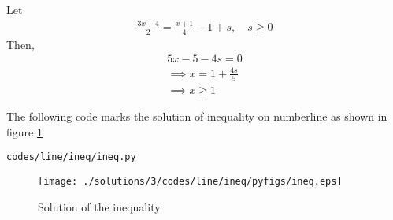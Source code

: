 Let 
% 
\begin{align}
\frac{3x-4}{2} = \frac{x+1}{4}-1 + s,  \quad s \geq 0
\end{align}
Then, 
\begin{align}
5x -5 -4s = 0 
\\
\implies x=1+\frac{4s}{5}
\\
\implies x \geq 1
\end{align}

The following code marks the solution of inequality on numberline as shown in figure \ref{fig:3.11.3_ineq_py}
\begin{lstlisting}
codes/line/ineq/ineq.py
\end{lstlisting}
\begin{figure}[!ht]
\centering
\texttt{[image: ./solutions/3/codes/line/ineq/pyfigs/ineq.eps]}
\caption{Solution of the inequality}
\label{fig:3.11.3_ineq_py}
\end{figure}

